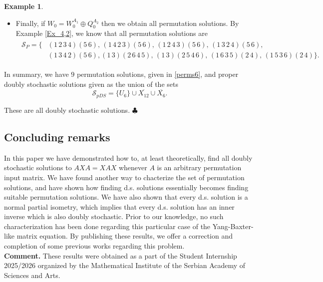 \documentclass{article}
\theoremstyle{definition}\newtheorem{example}{Example}[section]
\def\S{{\mathcal{S}}}
\begin{document}
\begin{example}
\begin{itemize}
 						\item Finally, if $W_0=W^{A_1}_0\oplus Q^{A_2}_0$ then we obtain all permutation solutions. By Example \ref{Ex_4,2}, we know that all permutation solutions are 	
 						\begin{eqnarray}\label{perms6}\begin{aligned}
 							\S_P=	\{&
 								(1\,2\,3\,4)(5\,6),\,
 								(1\,4\,2\,3)(5\,6),\,
 								(1\,2\,4\,3)(5\,6),\,
 								(1\,3\,2\,4)(5\,6),\\
 								&(1\,3\,4\,2)(5\,6),
 								(1\,3)(2\,6\,4\,5),\,
 								(1\,3)(2\,5\,4\,6),\,
 								(1\,6\,3\,5)(2\,4),\,
 								(1\,5\,3\,6)(2\,4)
 								\}.
 							\end{aligned}\end{eqnarray}
 						
 	\end{itemize}
		
	In summary, we have $9$ permutation solutions, given in \eqref{perms6}, and proper doubly stochastic solutions given as the union of the sets
	$$\S_{pDS}=\{U_6\}\cup \overline{X_{12}}\cup \overline{X_6}.$$	
		
		\noindent These are all doubly stochastic solutions. \hfill$\clubsuit$
	\end{example}
	
		\subsection*{Concluding remarks}
	In this paper we have demonstrated how to, at least theoretically, find all doubly stochastic solutions to $AXA=XAX$ whenever $A$ is an arbitrary permutation input matrix. We have found another way to chacterize the set of permutation solutions, and have shown how finding d.s. solutions essentially becomes finding suitable permutation solutions. We have also shown that every d.s. solution is a normal partial isometry, which implies that every d.s. solution has an inner inverse which is also doubly stochastic. Prior to our knowledge, no such characterization has been done regarding this particular case of the Yang-Baxter-like matrix equation. By publishing these results, we offer a correction and completion of some previous works regarding this problem. \\
	
	\noindent\textbf{Comment.} These results were obtained as a part of the Student Internship 2025/2026 organized by the Mathematical Institute of the Serbian Academy of Sciences and Arts.\\
	
\end{document}
